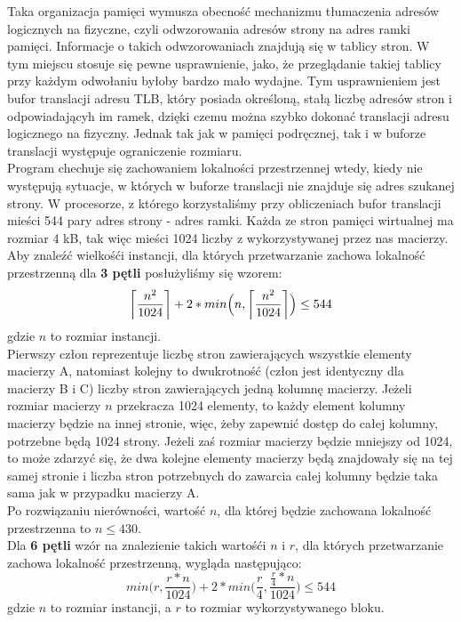 \documentclass[10pt,a4paper]{article}
\DeclarePairedDelimiter\ceil{\lceil}{\rceil}
\begin{document}
Taka organizacja pamięci wymusza obecność mechanizmu tłumaczenia adresów logicznych
na fizyczne, czyli odwzorowania adresów strony na adres ramki pamięci. Informacje o takich
odwzorowaniach znajdują się w tablicy stron. W tym miejscu stosuje się pewne usprawnienie, jako, że
przeglądanie takiej tablicy przy każdym odwołaniu byłoby bardzo mało wydajne. Tym usprawnieniem
jest bufor translacji adresu TLB, który posiada określoną, stałą liczbę adresów stron i odpowiadającyh
im ramek, dzięki czemu można szybko dokonać translacji adresu logicznego na fizyczny.
Jednak tak jak w pamięci podręcznej, tak i w buforze translacji występuje ograniczenie rozmiaru.\\

Program chechuje się zachowaniem lokalności przestrzennej wtedy, kiedy nie występują sytuacje,
w których w buforze translacji nie znajduje się adres szukanej strony. W procesorze, z którego
korzystaliśmy przy obliczeniach bufor translacji mieści 544 pary adres strony - adres ramki.
Każda ze stron pamięci wirtualnej ma rozmiar 4 kB, tak więc mieści 1024 liczby z wykorzystywanej
przez nas macierzy.\\

Aby znaleźć wielkośći instancji, dla których przetwarzanie zachowa lokalność przestrzenną dla
\textbf{3 pętli} posłużyliśmy się wzorem:
$$
\ceil*{\frac{n^2}{1024}} + 2 * min\Big(n, \ceil*{\frac{n^2}{1024}}\Big) \leq 544
$$
gdzie $n$ to rozmiar instancji.\\

Pierwszy człon reprezentuje liczbę stron zawierających wszystkie elementy macierzy A, natomiast kolejny
to dwukrotność (człon jest identyczny dla macierzy B i C) liczby stron zawierających jedną kolumnę macierzy.
Jeżeli rozmiar macierzy $n$ przekracza 1024 elementy, to każdy element kolumny macierzy będzie na innej stronie,
więc, żeby zapewnić dostęp do całej kolumny, potrzebne będą 1024 strony. Jeżeli zaś rozmiar macierzy będzie
mniejszy od 1024, to może zdarzyć się, że dwa kolejne elementy macierzy będą znajdowały się na tej samej 
stronie i liczba stron potrzebnych do zawarcia całej kolumny będzie taka sama jak w przypadku macierzy A.\\

Po rozwiązaniu nierówności, wartość $n$, dla której będzie zachowana lokalność przestrzenna to $n \leq 430$.
\\

Dla \textbf{6 pętli} wzór na znalezienie takich wartośći $n$ i $r$, dla których przetwarzanie zachowa
lokalność przestrzenną, wygląda następująco:
$$
min\Big(r, \frac{r*n}{1024}\Big) + 2*min\Big(\frac{r}{4}, \frac{\frac{r}{4} * n}{1024}\Big) \leq 544
$$
gdzie $n$ to rozmiar instancji, a $r$ to rozmiar wykorzystywanego bloku.\\
\end{document}
